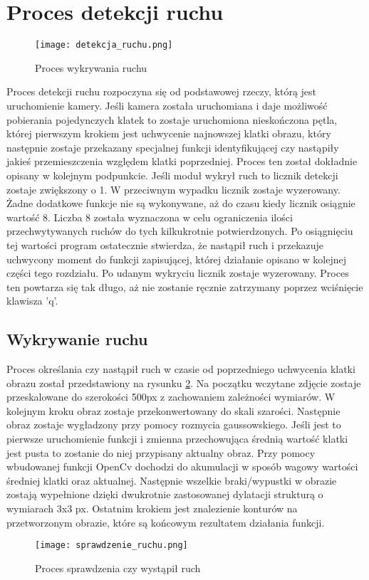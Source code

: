 \section{Proces detekcji ruchu}
\begin{figure}[H]
	\centering
	\texttt{[image: detekcja\_ruchu.png]}
	\caption{Proces wykrywania ruchu}
	\label{fig:proces_detekcji}
\end{figure}
Proces detekcji ruchu rozpoczyna się od podstawowej rzeczy, którą jest uruchomienie kamery. Jeśli kamera została uruchomiana i daje możliwość pobierania pojedynczych klatek to zostaje uruchomiona nieskończona pętla, której pierwszym krokiem jest uchwycenie najnowszej klatki obrazu, który następnie zostaje przekazany specjalnej funkcji identyfikującej czy nastąpiły jakieś przemieszczenia względem klatki poprzedniej. Proces ten został dokładnie opisany w kolejnym podpunkcie. Jeśli moduł wykrył ruch to licznik detekcji zostaje zwiększony o 1. W przeciwnym wypadku licznik zostaje wyzerowany. Żadne dodatkowe funkcje nie są wykonywane, aż do czasu kiedy licznik osiągnie wartość 8. Liczba 8 została wyznaczona w celu ograniczenia ilości przechwytywanych ruchów do tych kilkukrotnie potwierdzonych. Po osiągnięciu tej wartości program ostatecznie stwierdza, że nastąpił ruch i przekazuje uchwycony moment do funkcji zapisującej, której działanie opisano w kolejnej części tego rozdziału. Po udanym wykryciu licznik zostaje wyzerowany. Proces ten powtarza się tak długo, aż nie zostanie ręcznie zatrzymany poprzez wciśnięcie klawisza 'q'.

\subsection{Wykrywanie ruchu}
Proces określania czy nastąpił ruch w czasie od poprzedniego uchwycenia klatki obrazu został przedstawiony na rysunku \ref{fig:wykrywanie_ruchu}. Na początku wczytane zdjęcie zostaje przeskalowane do szerokości 500px z zachowaniem zależności wymiarów. W kolejnym kroku obraz zostaje przekonwertowany do skali szarości. Następnie obraz zostaje wygładzony przy pomocy rozmycia gaussowskiego. Jeśli jest to pierwsze uruchomienie funkcji i zmienna przechowująca średnią wartość klatki jest pusta to zostanie do niej przypisany aktualny obraz. Przy pomocy wbudowanej funkcji OpenCv dochodzi do akumulacji w sposób wagowy wartości średniej klatki oraz aktualnej. Następnie wszelkie braki/wypustki w obrazie zostają wypełnione dzięki dwukrotnie zastosowanej dylatacji strukturą o wymiarach 3x3 px. Ostatnim krokiem jest znalezienie konturów na przetworzonym obrazie, które są końcowym rezultatem działania funkcji.
 \begin{figure}[H]
	\centering
	\texttt{[image: sprawdzenie\_ruchu.png]}
	\caption{Proces sprawdzenia czy wystąpił ruch}
	\label{fig:wykrywanie_ruchu}
\end{figure}
